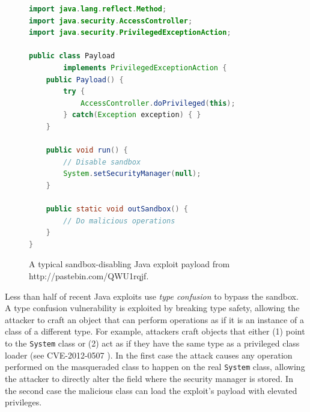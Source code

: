 \documentclass{sig-alternate}
\begin{document}
\begin{figure}
\begin{centering}
\begin{lstlisting}[language=Java,basicstyle={\scriptsize}]
import java.lang.reflect.Method; 
import java.security.AccessController; 
import java.security.PrivilegedExceptionAction;   

public class Payload 
        implements PrivilegedExceptionAction {         
    public Payload() {
        try {
            AccessController.doPrivileged(this);
        } catch(Exception exception) { }     
    }

    public void run() {
        // Disable sandbox
        System.setSecurityManager(null);
    }

    public static void outSandbox() {
        // Do malicious operations
    }
}
\end{lstlisting}

\par\end{centering}

\caption{A typical sandbox-disabling Java exploit payload from http://pastebin.com/QWU1rqjf.}
\label{fig:A-typical-exploit-payload}
\end{figure}


Less than half of recent Java exploits use \textit{type confusion}
to bypass the sandbox. A type confusion vulnerability is exploited
by breaking type safety, allowing the attacker to craft an object
that can perform operations as if it is an instance of a class of
a different type. For example, attackers craft objects that either
(1) point to the \texttt{System} class or (2) act as if they have
the same type as a privileged class loader (see CVE-2012-0507 \cite{_vulnerability_2012_0507}).
In the first case the attack causes any operation performed on the
masqueraded class to happen on the real \texttt{System} class, allowing
the attacker to directly alter the field where the security manager
is stored. In the second case the malicious class can load the exploit's
payload with elevated privileges.
\end{document}
